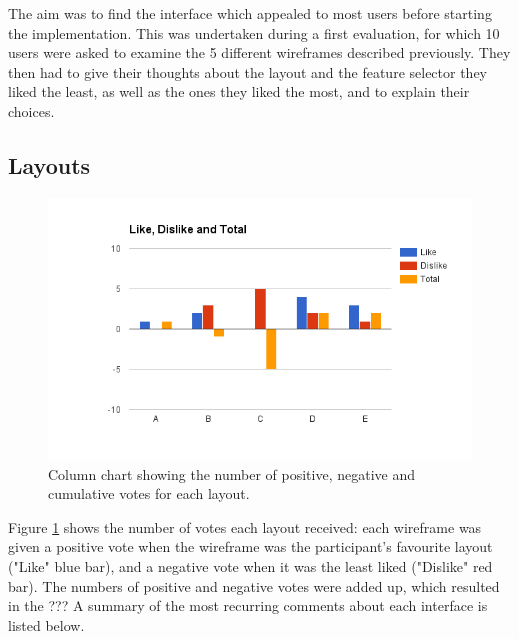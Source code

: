 \documentclass{mproj}
\begin{document}
The aim was to find the interface which appealed to most users before starting the implementation. This was undertaken during a first evaluation, for which 10 users were asked to examine the 5 different wireframes described previously. They then had to give their thoughts about the layout and the feature selector they liked the least, as well as the ones they liked the most, and to explain their choices.

\subsection*{Layouts}

\begin{figure}[h]
	\centering
	\includegraphics[trim=0cm 0cm 0cm 2cm, width=\textwidth]{images/layout_feedback}
	\caption{Column chart showing the number of positive, negative and cumulative votes for each layout.}
	\label{fig:layout_feedback}
\end{figure}

Figure \ref{fig:layout_feedback} shows the number of votes each layout received: each wireframe was given a positive vote when the wireframe was the participant's favourite layout ("Like" blue bar), and a negative vote when it was the least liked ("Dislike" red bar). The numbers of positive and negative votes were added up, which resulted in the ???  A summary of the most recurring comments about each interface is listed below.
\end{document}

